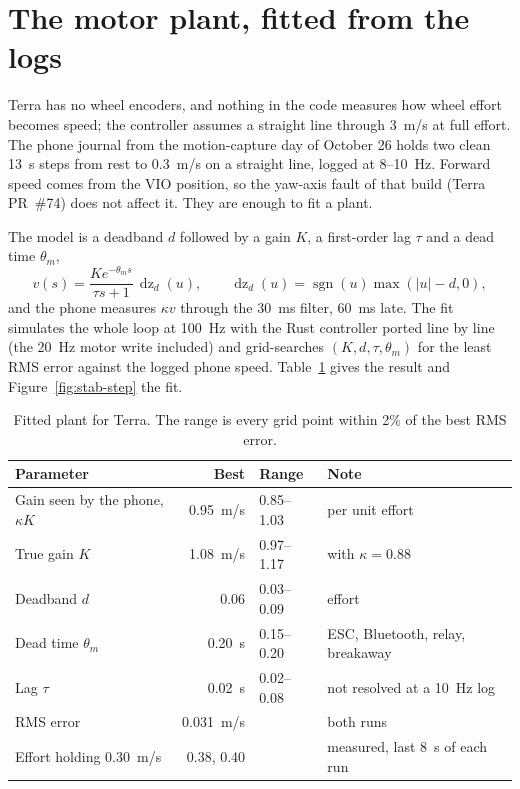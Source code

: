 \section{The motor plant, fitted from the logs}
\label{sec:stab-plant}

Terra has no wheel encoders, and nothing in the code measures how wheel effort becomes speed; the controller assumes a straight line through 3~m/s at full effort.
The phone journal from the motion-capture day of October 26 holds two clean 13~s steps from rest to 0.3~m/s on a straight line, logged at 8--10~Hz. Forward speed comes from the VIO position, so the yaw-axis fault of that build (Terra PR~\#74) does not affect it.
They are enough to fit a plant.

The model is a deadband $d$ followed by a gain $K$, a first-order lag $\tau$ and a dead time $\theta_m$,
\begin{equation}
  v(s) = \frac{K e^{-\theta_m s}}{\tau s + 1}\, \operatorname{dz}_d(u), \qquad
  \operatorname{dz}_d(u) = \operatorname{sgn}(u) \max(|u| - d, 0),
  \label{eq:stab-plant}
\end{equation}
and the phone measures $\kappa v$ through the 30~ms filter, 60~ms late.
The fit simulates the whole loop at 100~Hz with the Rust controller ported line by line (the 20~Hz motor write included) and grid-searches $(K, d, \tau, \theta_m)$ for the least RMS error against the logged phone speed.
Table~\ref{tab:stab-plant} gives the result and Figure~\ref{fig:stab-step} the fit.

\begin{table}[ht]
\centering
\caption{Fitted plant for Terra. The range is every grid point within 2\% of the best RMS error.}
\label{tab:stab-plant}
\small
\begin{tabular}{@{}l r l l@{}}
\toprule
Parameter & Best & Range & Note \\
\midrule
Gain seen by the phone, $\kappa K$ & 0.95~m/s & 0.85--1.03 & per unit effort \\
True gain $K$ & 1.08~m/s & 0.97--1.17 & with $\kappa = 0.88$ \\
Deadband $d$ & 0.06 & 0.03--0.09 & effort \\
Dead time $\theta_m$ & 0.20~s & 0.15--0.20 & ESC, Bluetooth, relay, breakaway \\
Lag $\tau$ & 0.02~s & 0.02--0.08 & not resolved at a 10~Hz log \\
RMS error & 0.031~m/s & & both runs \\
Effort holding 0.30~m/s & 0.38, 0.40 & & measured, last 8~s of each run \\
\bottomrule
\end{tabular}
\end{table}

